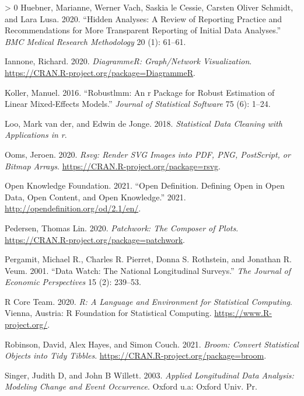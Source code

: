 \documentclass{article}
\newlength{\cslhangindent}
\newenvironment{CSLReferences}[3] %
 {%
  \setlength{\parindent}{0pt}
  \ifodd #1 \everypar{\setlength{\hangindent}{\cslhangindent}}\ignorespaces\fi
  \ifnum #2 > 0
  \setlength{\parskip}{#2\baselineskip}
  \fi
 }%
 {}
\begin{document}
\begin{CSLReferences}{1}{0}
\leavevmode\hypertarget{ref-HuebnerMarianne2020Haar}{}%
Huebner, Marianne, Werner Vach, Saskia le Cessie, Carsten Oliver Schmidt, and Lara Lusa. 2020. {``Hidden Analyses: A Review of Reporting Practice and Recommendations for More Transparent Reporting of Initial Data Analyses.''} \emph{BMC Medical Research Methodology} 20 (1): 61--61.

\leavevmode\hypertarget{ref-DiagrammeR}{}%
Iannone, Richard. 2020. \emph{DiagrammeR: Graph/Network Visualization}. \url{https://CRAN.R-project.org/package=DiagrammeR}.

\leavevmode\hypertarget{ref-KollerManuel2016rARP}{}%
Koller, Manuel. 2016. {``Robustlmm: An r Package for Robust Estimation of Linear Mixed-Effects Models.''} \emph{Journal of Statistical Software} 75 (6): 1--24.

\leavevmode\hypertarget{ref-LooMarkvander2018Sdcw}{}%
Loo, Mark van der, and Edwin de Jonge. 2018. \emph{Statistical Data Cleaning with Applications in r}.

\leavevmode\hypertarget{ref-rsvg}{}%
Ooms, Jeroen. 2020. \emph{Rsvg: Render SVG Images into PDF, PNG, PostScript, or Bitmap Arrays}. \url{https://CRAN.R-project.org/package=rsvg}.

\leavevmode\hypertarget{ref-opendata}{}%
Open Knowledge Foundation. 2021. {``Open Definition. Defining Open in Open Data, Open Content, and Open Knowledge.''} 2021. \url{http://opendefinition.org/od/2.1/en/}.

\leavevmode\hypertarget{ref-patchwork}{}%
Pedersen, Thomas Lin. 2020. \emph{Patchwork: The Composer of Plots}. \url{https://CRAN.R-project.org/package=patchwork}.

\leavevmode\hypertarget{ref-MichaelRPergamit2001DWTN}{}%
Pergamit, Michael R., Charles R. Pierret, Donna S. Rothstein, and Jonathan R. Veum. 2001. {``Data Watch: The National Longitudinal Surveys.''} \emph{The Journal of Economic Perspectives} 15 (2): 239--53.

\leavevmode\hypertarget{ref-R}{}%
R Core Team. 2020. \emph{R: A Language and Environment for Statistical Computing}. Vienna, Austria: R Foundation for Statistical Computing. \url{https://www.R-project.org/}.

\leavevmode\hypertarget{ref-broom}{}%
Robinson, David, Alex Hayes, and Simon Couch. 2021. \emph{Broom: Convert Statistical Objects into Tidy Tibbles}. \url{https://CRAN.R-project.org/package=broom}.

\leavevmode\hypertarget{ref-SingerJudithD2003Alda}{}%
Singer, Judith D, and John B Willett. 2003. \emph{Applied Longitudinal Data Analysis: Modeling Change and Event Occurrence}. Oxford u.a: Oxford Univ. Pr.


\end{CSLReferences}
\end{document}
